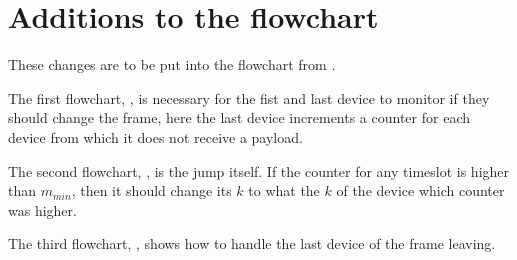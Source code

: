 \section{Additions to the flowchart}
These changes are to be put into the flowchart from .

The first flowchart, , is necessary for the fist and last device to monitor if they should change the frame, here the last device increments a counter for each device from which it does not receive a payload.

The second flowchart, , is the jump itself.
If the counter for any timeslot is higher than $m_{min}$, then it should change its $k$ to what the $k$ of the device which counter was higher.

The third flowchart, , shows how to handle the last device of the frame leaving.
